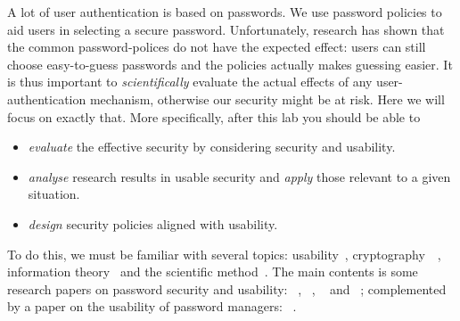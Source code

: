 A lot of user authentication is based on passwords.
We use password policies to aid users in selecting a secure password.
Unfortunately, research has shown that the common password-polices do not have 
the expected effect: users can still choose easy-to-guess passwords and the 
policies actually makes guessing easier.
It is thus important to \emph{scientifically} evaluate the actual effects of 
any user-authentication mechanism, otherwise our security might be at risk.
Here we will focus on exactly that.
More specifically, after this lab you should be able to
\begin{itemize}
  \item \emph{evaluate} the effective security by considering security and 
    usability.
  \item \emph{analyse} research results in usable security and \emph{apply} 
    those relevant to a given situation.
  \item \emph{design} security policies aligned with usability.
\end{itemize}

To do this, we must be familiar with several topics: 
usability~\cite[Ch.~2]{Anderson2008sea}, 
cryptography~\cite[Ch.~5]{Anderson2008sea}~\cite{BoskHighLevelCrypto},  
information theory~\cite{Ueltschi2013se} and the scientific 
method~\cite{ComputerSecurityExperiments}.
The main contents is some research papers on password security and usability:
~\cite{GuessAgainAndAgain},
~\cite{OfPasswordsAndPeople}, 
~\cite{CanLongPasswordsBeSecureAndUsable} 
and
~\cite{PasswordLifeCycle};
complemented by a paper on the usability of password managers:
~\cite{UsabilityEvaluationOfPasswordManagers}.
